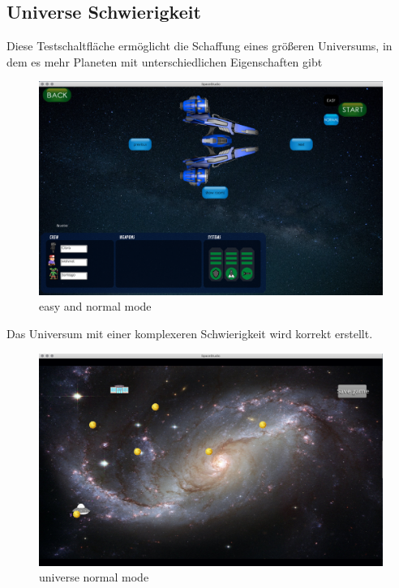 \documentclass[11pt]{article}
\begin{document}
\newpage
\subsection{Universe Schwierigkeit}

Diese Testschaltfläche ermöglicht die Schaffung eines größeren Universums, in dem es mehr Planeten mit unterschiedlichen Eigenschaften gibt\\
\begin{figure}
\centering
\includegraphics[scale=0.3]{TestProtocolBilder/universeButon.png}
\caption{easy and normal mode}
\end{figure}

\newpage
Das Universum mit einer komplexeren Schwierigkeit wird korrekt erstellt.\\

\begin{figure}[t]
\centering
\includegraphics[scale=0.3]{TestProtocolBilder/universeHard.png}
\caption{universe normal mode}
\end{figure}
\end{document}
